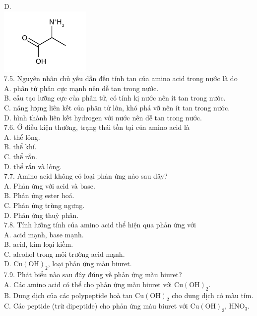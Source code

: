 \documentclass[10pt]{article}
\begin{document}
D.\\
\includegraphics{smile-7b506e40cff65df5377a381a20d1a03d208d91f0}\\
7.5. Nguyên nhân chủ yếu dẫn đến tính tan của amino acid trong nước là do\\
A. phân tử phân cực mạnh nên dễ tan trong nước.\\
B. cấu tạo lưỡng cực của phân tử, có tính kị nước nên ít tan trong nước.\\
C. năng lượng liên kết của phân tử lớn, khó phá vỡ nên ít tan trong nước.\\
D. hình thành liên kết hydrogen với nước nên dễ tan trong nước.\\
7.6. Ở điều kiện thường, trạng thái tồn tại của amino acid là\\
A. thể lỏng.\\
B. thể khí.\\
C. thể rắn.\\
D. thể rắn và lỏng.\\
7.7. Amino acid không có loại phản ứng nào sau đây?\\
A. Phản ứng với acid và base.\\
B. Phản ứng ester hoá.\\
C. Phản ứng trùng ngưng.\\
D. Phản ứng thuỷ phân.\\
7.8. Tính lưỡng tính của amino acid thể hiện qua phản ứng với\\
A. acid mạnh, base mạnh.\\
B. acid, kim loại kiềm.\\
C. alcohol trong môi trường acid mạnh.\\
D. $\mathrm{Cu}(\mathrm{OH})_{2}$, loại phản ứng màu biuret.\\
7.9. Phát biểu nào sau đây đúng về phản ứng màu biuret?\\
A. Các amino acid có thể cho phản ứng màu biuret với $\mathrm{Cu}(\mathrm{OH})_{2}$.\\
B. Dung dịch của các polypeptide hoà tan $\mathrm{Cu}(\mathrm{OH})_{2}$ cho dung dịch có màu tím.\\
C. Các peptide (trừ dipeptide) cho phản ứng màu biuret với $\mathrm{Cu}(\mathrm{OH})_{2}$, $\mathrm{HNO}_{3}$.\\
\end{document}
